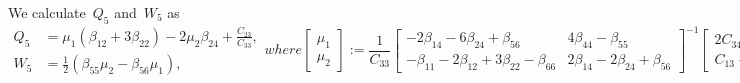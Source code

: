 \documentclass[preprint,10pt,times]{elsarticle}
\numberwithin{equation}{section}
\renewcommand{\>}{$\Rightarrow$}
\begin{document}
We calculate~$Q_5$ and~$W_5$ as
\begin{subequations}
	\begin{align}
	Q_5 & = \mu_1(\beta_{12} + 3\beta_{22})-2\mu_2\beta_{24} + \frac{C_{23}}{C_{33}}, \\
	W_5 & = \frac{1}{2}(\beta_{55}\mu_2 - \beta_{56}\mu_1),
	\end{align}
	where
	\begin{equation}
	\begin{bmatrix}
		\mu_1 \\ \mu_2
	\end{bmatrix} :=
	\frac{1}{C_{33}}
	\begin{bmatrix}
		-2\beta_{14}-6\beta_{24}+\beta_{56} & 4\beta_{44}-\beta_{55} \\
		-\beta_{11}-2\beta_{12}+3\beta_{22}-\beta_{66} & 2\beta_{14}-2\beta_{24}+\beta_{56}
	\end{bmatrix}^{-1}
	\begin{bmatrix}
			2C_{34} \\ C_{13}-C_{23}
	\end{bmatrix}.
	\end{equation}
\end{subequations}
\end{document}
